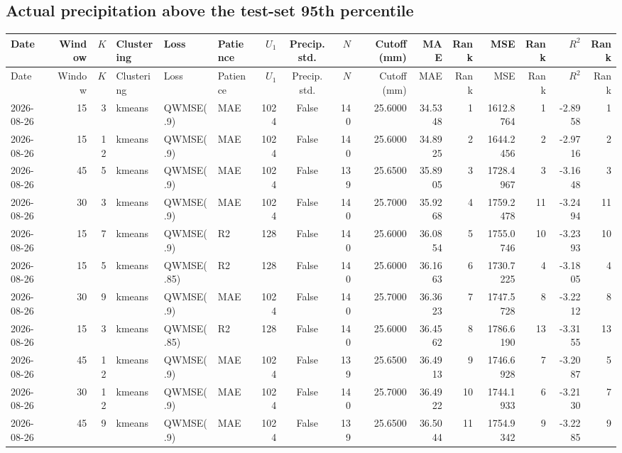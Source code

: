 \documentclass[10pt]{article}
\begin{document}
\begin{landscape}
\subsection*{Actual precipitation above the test-set 95th percentile}
\footnotesize
\setlength{\tabcolsep}{3pt}
\begin{longtable}{@{}lrrlllrcrrrrrrrr@{}}
\toprule
Date & Window & $K$ & Clustering & Loss & Patience & $U_1$ & Precip. std. & $N$ & Cutoff (mm) & MAE & Rank & MSE & Rank & $R^2$ & Rank \\
\midrule
\endfirsthead
\toprule
Date & Window & $K$ & Clustering & Loss & Patience & $U_1$ & Precip. std. & $N$ & Cutoff (mm) & MAE & Rank & MSE & Rank & $R^2$ & Rank \\
\midrule
\endhead
2026-08-26 & 15 & 3 & kmeans & QWMSE(.9) & MAE & 1024 & False & 140 & 25.6000 & 34.5348 & 1 & 1612.8764 & 1 & -2.8958 & 1 \\
2026-08-26 & 15 & 12 & kmeans & QWMSE(.9) & MAE & 1024 & False & 140 & 25.6000 & 34.8925 & 2 & 1644.2456 & 2 & -2.9716 & 2 \\
2026-08-26 & 45 & 5 & kmeans & QWMSE(.9) & MAE & 1024 & False & 139 & 25.6500 & 35.8905 & 3 & 1728.4967 & 3 & -3.1648 & 3 \\
2026-08-26 & 30 & 3 & kmeans & QWMSE(.9) & MAE & 1024 & False & 140 & 25.7000 & 35.9268 & 4 & 1759.2478 & 11 & -3.2494 & 11 \\
2026-08-26 & 15 & 7 & kmeans & QWMSE(.9) & R2 & 128 & False & 140 & 25.6000 & 36.0854 & 5 & 1755.0746 & 10 & -3.2393 & 10 \\
2026-08-26 & 15 & 5 & kmeans & QWMSE(.85) & R2 & 128 & False & 140 & 25.6000 & 36.1663 & 6 & 1730.7225 & 4 & -3.1805 & 4 \\
2026-08-26 & 30 & 9 & kmeans & QWMSE(.9) & MAE & 1024 & False & 140 & 25.7000 & 36.3623 & 7 & 1747.5728 & 8 & -3.2212 & 8 \\
2026-08-26 & 15 & 3 & kmeans & QWMSE(.85) & R2 & 128 & False & 140 & 25.6000 & 36.4562 & 8 & 1786.6190 & 13 & -3.3155 & 13 \\
2026-08-26 & 45 & 12 & kmeans & QWMSE(.9) & MAE & 1024 & False & 139 & 25.6500 & 36.4913 & 9 & 1746.6928 & 7 & -3.2087 & 5 \\
2026-08-26 & 30 & 12 & kmeans & QWMSE(.9) & MAE & 1024 & False & 140 & 25.7000 & 36.4922 & 10 & 1744.1933 & 6 & -3.2130 & 7 \\
2026-08-26 & 45 & 9 & kmeans & QWMSE(.9) & MAE & 1024 & False & 139 & 25.6500 & 36.5044 & 11 & 1754.9342 & 9 & -3.2285 & 9 \\

\end{longtable}
\end{landscape}
\end{document}

